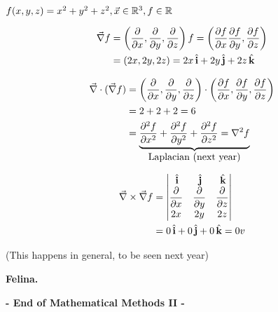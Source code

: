 \documentclass[10pt]{scrartcl}
\begin{document}
\begin{example}
	$f(x,y,z) = x^2 + y^2 + z^2, \vec{x} \in\mathbb{R}^3, f \in\mathbb{R}$
	
	\[
\begin{aligned}
  \vec{\nabla}f &= \left(\frac{\del}{\del x}, \frac{\del}{\del y}, \frac{\del}{\del z}\right)f =  \left(\frac{\del f}{\del x}\frac{\del f}{\del y}, \frac{\del f}{\del z}\right)\\
  &= (2x,2y,2z) = 2x\hat{i} + 2y\hat{j} + 2z\hat{k}
\end{aligned}
\]

\[
\begin{aligned}
  \vec{\nabla}\cdot(\vec{\nabla}f) &= \left(\frac{\partial}{\partial x}, \frac{\partial}{\partial y}, \frac{\partial}{\partial z}\right) \cdot \left(\frac{\partial f}{\partial x}, \frac{\partial f}{\partial y}, \frac{\partial f}{\partial z}\right)\\
  &= 2 + 2 + 2 = 6\\
  &= \underbrace{\frac{\partial ^2f}{\partial x^2} + \frac{\partial^2f}{\partial y^2} + \frac{\partial^2f}{\partial z^2} = \nabla^2f}_{\mbox{Laplacian (next year)}}
\end{aligned}
\]

\[
\begin{aligned}
  \vec{\nabla} \times \vec{\nabla}f &= 
  \begin{vmatrix}
 \hat{i} & \hat{j} & \hat{k}\\
 \dfrac{\del}{\del x} & \dfrac{\del}{\del y} & \dfrac{\del}{\del z}\\
 2x & 2y & 2z
 \end{vmatrix}\\
 &= 0\hat{i} + 0\hat{j} + 0\hat{k} = 0v
\end{aligned}
\]

(This happens in general, to be seen next year)
\end{example}









\textbf{Felina.} 


  \begin{center}
  \textsf{\textbf{- End of Mathematical Methods II -}}	
  \end{center}
  
\end{document}
